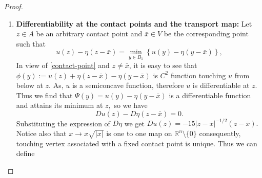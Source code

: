 \documentclass{amsart}
\theoremstyle{plain}
\numberwithin{equation}{section}
\begin{document}
\begin{proof}
\begin{enumerate}
 define
\[\Psi_{\bar x}(y):=u(y)-\eta(y-\bar x)~~\text{for}~~y\in B_{1},\]
where $\eta(x)=-10|x|^{\frac32}.$ Notice that $\Psi_{\bar{x}}$ is a lower semicontinuous function therefore, there exists a point
$z=z(\bar x)\in\overline{B_{1}}$ such that
\begin{equation*}\label{eq:contact-minimum}
\Psi_{\bar x}(z)=\min_{y\in B_{1}}\Psi_{\bar x}(y).
\end{equation*}
We claim that $z$ lies in the interior of $B_{1}.$ In fact, for $z\in B_{1}$ we have 
\[
\begin{aligned}
u(z)-\eta(z-\bar x)&\leq u(x_{0})-\eta(x_{0}-\bar x)\\
&\leq1+10|x_{0}-\bar x|^{3/2}=1+\frac{5}{\sqrt{2}},
\end{aligned}
\]
 where we have used  $|x_{0}-\bar x|\leq 1/2.$  On the other hand for $z\in\partial B_{1}$ we have 
\[
\begin{aligned}
u(z)-\eta(z-\bar x)&\ge10\left(\frac34\right)^{3/2}\\
&=\frac{15\sqrt3}{4},
\end{aligned}
\]
where we have used $|z-\bar x|\geq3/4$ and $u\geq 0.$ As $1+\frac5{\sqrt2}<
\frac{15\sqrt3}{4},$ so $z\in B_{1}.$ Moreover by choosing $M>
1+\frac5{\sqrt2},$ we find that $z\not=\bar{x}.$  Consequently,
the cusp function
\[y\longmapsto\eta(y-\bar x)\]
is of class $C^{2}$ in a neighbourhood of the contact point.
\[A:=\left\{z\in B_{1}:\exists~\bar x\in V
~\text{such that}~u(z)-\eta(z-\bar x)=\min_{y\in B_{1}}
\left(u(y)-\eta(y-\bar x)\right)\right\}.\]
As $u(z)<M,$ so we have
\[|A|\le|\{u\le M\}\cap B_{1}|\le\delta|B_{1}|.\]
\item{}\textbf{Differentiability at the contact points and the transport map:}
Let $z\in A$ be an arbitrary contact point and $\bar x\in V$ be the corresponding point such that
\begin{equation}\label{contact-point}
u(z)-\eta(z-\bar x)=\min_{y\in B_{1}}\left\{u(y)-\eta(y-\bar x)\right\},
\end{equation}
In view of \eqref{contact-point} and $z\not=\bar{x}$, it is easy to see that $\phi(y):=u(z)+\eta(z-\bar x)-\eta(y-\bar x)$ is $C^{2}$ function touching $u$ from below at $z.$ As, $u$ is a semiconcave function, therefore $u$ is differentiable at $z.$ Thus we find that $\Psi(y)=u(y)-\eta(y-\bar x)$ is a differentiable function and attains its minimum at $z,$ so we have
\begin{equation}\label{tref}
Du(z)-D\eta(z-\bar x)=0.
\end{equation}
Substituting the expression of $D\eta$ we get  $Du(z)=-15|z-\bar x|^{-1/2}(z-\bar x).$ Notice also that $x\to x\sqrt{|x|}$ is one to one map on $\mathbb{R}^{n}\setminus\{0\}$ consequently, touching vertex associated with a fixed contact point is unique. Thus we can define

\end{enumerate}
\end{proof}
\end{document}
